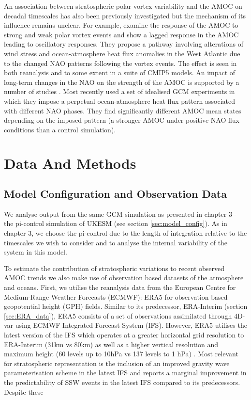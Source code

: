 An association between stratospheric polar vortex variability and the AMOC on decadal timescales has also been previously investigated \citep{reichlerStratospheric2012, Schimanke2011} but the mechanism of its influence remains unclear. For example, \cite{reichlerStratospheric2012} examine the response of the AMOC to strong and weak polar vortex events and show a lagged response in the AMOC leading to oscillatory responses. They propose a pathway involving alterations of wind stress and ocean-atmosphere heat flux anomalies in the West Atlantic due to the changed NAO patterns following the vortex events. The effect is seen in both reanalysis and to some extent in a suite of CMIP5 models. An impact of long-term changes in the NAO on the strength of the AMOC is supported by a number of studies \citep{visbeckOcean1998, delworthImplications2000, delworthMultidecadal2000, edenMechanism2001}. Most recently \cite{delworthImpact2016} used a set of idealised GCM experiments in which they impose a perpetual ocean-atmosphere heat flux pattern associated with different NAO phases. They find significantly different AMOC mean states depending on the imposed pattern (a stronger AMOC under positive NAO flux conditions than a control simulation). 


\section{Data And Methods}
\subsection{Model Configuration and Observation Data}

We analyse output from the same GCM simulation as presented in chapter 3 - the pi-control simulation of UKESM (see section \ref{sec:model_config}). As in chapter 3, we choose the pi-control due to the length of integration relative to the timescales we wish to consider and to analyse the internal variability of the system in this model. 

To estimate the contribution of stratospheric variations to recent observed AMOC trends we also make use of observation based datasets of the atmosphere and oceans. First, we utilise the reanalysis data from the European Centre for Medium-Range Weather Forecasts (ECMWF): ERA5 \citep{hersbachERA52020} for observation based geopotential height (GPH) fields. Similar to its predecessor, ERA-Interim (section \ref{sec:ERA_data}), ERA5 consists of a set of observations assimilated through 4D-var using ECMWF Integrated Forecast System (IFS). However, ERA5 utilises the latest version of the IFS which operates at a greater horizontal grid resolution to ERA-Interim (31km vs 80km) as well as a higher vertical resolution and maximum height (60 levels up to 10hPa vs 137 levels to 1 hPa) \citep{hersbachERA52020}. Most relevant for stratospheric representation is the inclusion of an improved gravity wave parameterisation scheme in the latest IFS  and \cite{hersbachERA52020} reports a marginal improvement in the predictability of SSW events in the latest IFS compared to its predecessors. Despite these 

